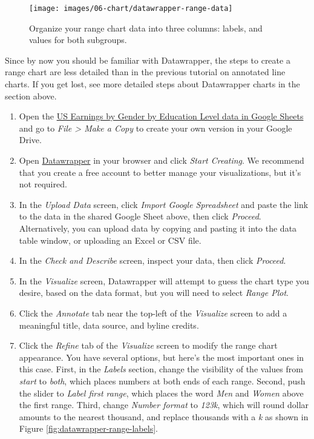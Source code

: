 \documentclass[
  english,
]{book}
\begin{document}
\begin{figure}
\texttt{[image: images/06-chart/datawrapper-range-data]} \caption{Organize your range chart data into three columns: labels, and values for both subgroups.}\label{fig:datawrapper-range-data}
\end{figure}

Since by now you should be familiar with Datawrapper, the steps to create a range chart are less detailed than in the previous tutorial on annotated line charts. If you get lost, see more detailed steps about Datawrapper charts in the section above.

\begin{enumerate}
\def\labelenumi{\arabic{enumi}.}
\item
  Open the \href{https://docs.google.com/spreadsheets/d/1qAfMHBegOz1-ZlN9UurZ_wsesmLGYlu_ch7M3Anwdsg/edit\#gid=0}{US Earnings by Gender by Education Level data in Google Sheets} and go to \emph{File \textgreater{} Make a Copy} to create your own version in your Google Drive.
\item
  Open \href{https://www.datawrapper.de}{Datawrapper} in your browser and click \emph{Start Creating}. We recommend that you create a free account to better manage your visualizations, but it's not required.
\item
  In the \emph{Upload Data} screen, click \emph{Import Google Spreadsheet} and paste the link to the data in the shared Google Sheet above, then click \emph{Proceed}. Alternatively, you can upload data by copying and pasting it into the data table window, or uploading an Excel or CSV file.
\item
  In the \emph{Check and Describe} screen, inspect your data, then click \emph{Proceed}.
\item
  In the \emph{Visualize} screen, Datawrapper will attempt to guess the chart type you desire, based on the data format, but you will need to select \emph{Range Plot}.
\item
  Click the \emph{Annotate} tab near the top-left of the \emph{Visualize} screen to add a meaningful title, data source, and byline credits.
\item
  Click the \emph{Refine} tab of the \emph{Visualize} screen to modify the range chart appearance. You have several options, but here's the most important ones in this case. First, in the \emph{Labels} section, change the visibility of the values from \emph{start} to \emph{both}, which places numbers at both ends of each range. Second, push the slider to \emph{Label first range}, which places the word \emph{Men} and \emph{Women} above the first range. Third, change \emph{Number format} to \emph{123k}, which will round dollar amounts to the nearest thousand, and replace thousands with a \emph{k} as shown in Figure \ref{fig:datawrapper-range-labels}.
\end{enumerate}
\end{document}
